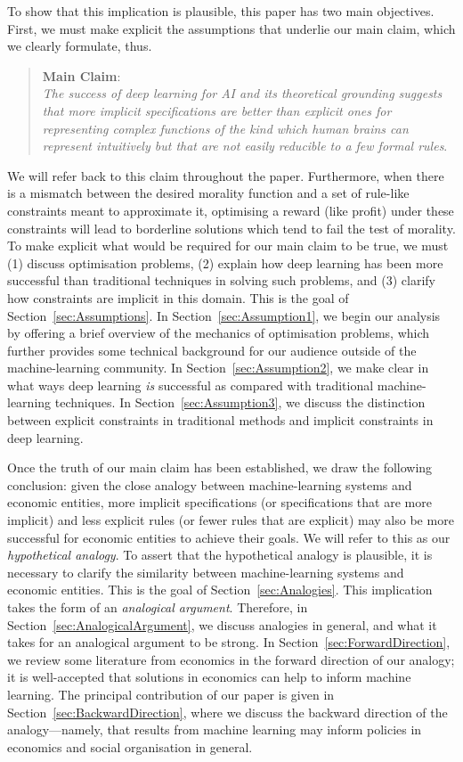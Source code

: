 \documentclass{amsart}
\theoremstyle{indented}
\theoremstyle{indentedProp}
\theoremstyle{indented}
\theoremstyle{indented}
\theoremstyle{indented}
\theoremstyle{indented}
\theoremstyle{indented}
\begin{document}
To show that this implication is plausible, this paper has two main objectives. First, we must make explicit the assumptions that underlie our main claim, which we clearly formulate, thus.
\begin{quote}
    {\bf Main Claim}:\\
{\it The success of deep learning for AI and its theoretical grounding suggests that more implicit specifications are better than explicit ones for representing complex functions of the kind which human brains can represent intuitively but that are not easily reducible to a few formal rules}.
\end{quote}
We will refer back to this claim throughout the paper. Furthermore, when there is a mismatch between the desired morality function and a set of rule-like constraints meant to approximate it, optimising a reward (like profit) under these constraints will lead to borderline solutions which tend to fail the test of morality. To make explicit what would be required for our main claim to be true, we must (1) discuss optimisation problems, (2) explain how deep learning has been more successful than traditional techniques in solving such problems, and (3) clarify how constraints are implicit in this domain. This is the goal of Section~\ref{sec:Assumptions}. In Section~\ref{sec:Assumption1}, we begin our analysis by offering a brief overview of the mechanics of optimisation problems, which further provides some technical background for our  audience outside of the machine-learning community. In Section~\ref{sec:Assumption2}, we make clear in what ways deep learning {\it is} successful as compared with traditional machine-learning techniques. In Section~\ref{sec:Assumption3}, we discuss the distinction between explicit constraints in traditional methods and implicit constraints in deep learning.

Once the truth of our main claim has been established, we draw the following conclusion: given the close analogy between machine-learning systems and economic entities, more implicit specifications (or specifications that are more implicit)
and less explicit rules (or fewer rules that are explicit) may also be more successful for economic entities to achieve their goals. We will refer to this as our {\it hypothetical analogy}. To assert that the hypothetical analogy is plausible, it is necessary to clarify the similarity between machine-learning systems and economic entities. This is the goal of Section~\ref{sec:Analogies}. This implication takes the form of an {\it analogical argument}. Therefore, in Section~\ref{sec:AnalogicalArgument}, we discuss analogies in general, and what it takes for an analogical argument to be strong. In Section~\ref{sec:ForwardDirection}, we review some literature from economics in the forward direction of our analogy; it is well-accepted that solutions in economics can help to inform machine learning. The principal contribution of our paper is given in Section~\ref{sec:BackwardDirection}, where we discuss the backward direction of the analogy---namely, that results from machine learning may inform policies in economics and social organisation in general.
\end{document}
